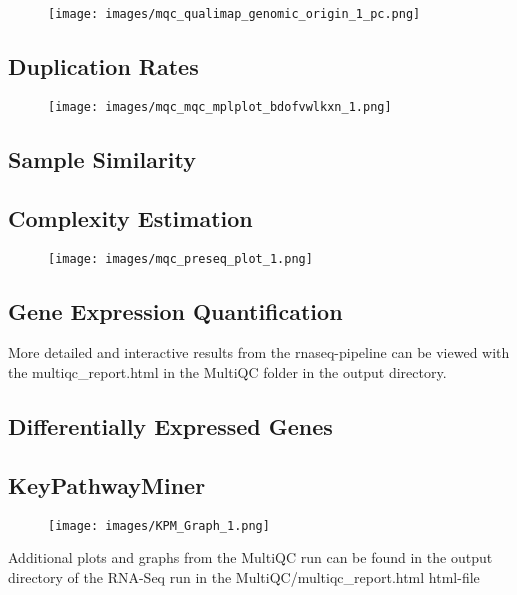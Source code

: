 \documentclass{article}
\begin{document}
\begin{figure}[h]
\centering
\texttt{[image: images/mqc\_qualimap\_genomic\_origin\_1\_pc.png]}
\caption[Genomic Origin]{}
\end{figure}
\FloatBarrier

\newpage
\subsection*{Duplication Rates}

\begin{figure}[h]
\centering
\texttt{[image: images/mqc\_mqc\_mplplot\_bdofvwlkxn\_1.png]}
\caption[DupRadar General Linear Models]{}
\end{figure}
\FloatBarrier

\subsection*{Sample Similarity}

\subsection*{Complexity Estimation}

\begin{figure}[h]
\centering
\texttt{[image: images/mqc\_preseq\_plot\_1.png]}
\caption[Complexity Curve]{}
\end{figure}
\FloatBarrier

\newpage
\subsection*{Gene Expression Quantification}

More detailed and interactive results from the rnaseq-pipeline can be viewed with the multiqc\_report.html in the MultiQC folder in the output directory.

\subsection*{Differentially Expressed Genes}


\subsection*{KeyPathwayMiner}

\begin{figure}[h]
\centering
\texttt{[image: images/KPM\_Graph\_1.png]}
\caption[KeyPathwayMiner computed pathway]{}
\end{figure}

\newpage
Additional plots and graphs from the MultiQC run can be found in the output directory of the RNA-Seq run in the MultiQC/multiqc\_report.html html-file 
\end{document}

